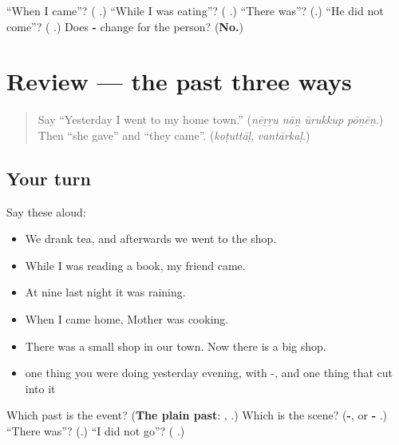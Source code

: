 \begin{tcolorbox}[breakable,colback=teal!4,colframe=teal!35!black,title={Before you move on}]
\textquotedblleft{}When I came\textquotedblright{}? (\textbf{  }.) \textquotedblleft{}While I was eating\textquotedblright{}? (\textbf{ }.) \textquotedblleft{}There was\textquotedblright{}? (\textbf{}.) \textquotedblleft{}He did not come\textquotedblright{}? (\textbf{ }.) Does \textbf{-} change for the person? (\textbf{No.})
\end{tcolorbox}
\section[(review)]{Review — the past three ways}

\label{lesson:TA-R284-the-past-three-ways}



\begin{quote}
Say \textquotedblleft{}Yesterday I went to my home town.\textquotedblright{} (\emph{nēṟṟu nāṉ ūrukkup pōṉēṉ}.) Then \textquotedblleft{}she gave\textquotedblright{} and \textquotedblleft{}they came\textquotedblright{}. (\emph{koṭuttāḷ}, \emph{vantārkaḷ}.)
\end{quote}

\subsection*{Your turn}
Say these aloud:

\begin{itemize}
\raggedright
  \item We drank tea, and afterwards we went to the shop.
  \item While I was reading a book, my friend came.
  \item At nine last night it was raining.
  \item When I came home, Mother was cooking.
  \item There was a small shop in our town. Now there is a big shop.
  \item one thing you were doing yesterday evening, with -, and one thing that cut into it
\end{itemize}

\begin{tcolorbox}[breakable,colback=teal!4,colframe=teal!35!black,title={Before you move on}]
Which past is the event? (\textbf{The plain past}: \textbf{}, \textbf{}.) Which is the scene? (\textbf{-}, or \textbf{- }.) \textquotedblleft{}There was\textquotedblright{}? (\textbf{}.) \textquotedblleft{}I did not go\textquotedblright{}? (\textbf{ }.)
\end{tcolorbox}
